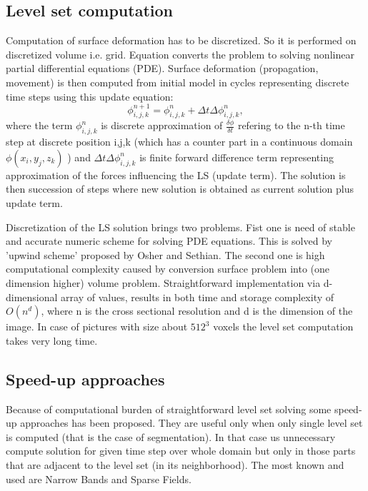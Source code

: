 \subsection{Level set computation}

Computation of surface deformation has to be discretized. So it is performed on discretized volume i.e. grid.
Equation converts the problem to solving nonlinear partial differential equations (PDE).
Surface deformation (propagation, movement) is then computed from initial model in cycles representing discrete time steps using this update equation:
\begin{equation}
\label{deformEqApprox}
\phi_{i,j,k}^{n+1} = \phi_{i,j,k}^{n} + \Delta t \Delta \phi_{i,j,k}^{n},
\end{equation}
where the term $\phi_{i,j,k}^{n}$ is discrete approximation of $\frac{\delta\phi}{\delta t}$ refering to the n-th time step at discrete position i,j,k (which has a counter part in a continuous domain $\phi(x_i, y_j, z_k)$ ) and $\Delta t \Delta \phi_{i,j,k}^{n}$ is finite forward difference term representing approximation of the forces influencing the LS (update term). The solution is then succession of steps where new solution is obtained as current solution plus update term.

Discretization of the LS solution brings two problems.
Fist one is need of stable and accurate numeric scheme for solving PDE equations.
This is solved by 'upwind scheme' proposed by Osher and Sethian\cite{sethianLS}.
The second one is high computational complexity caused by conversion surface problem into (one dimension higher) volume problem.
Straightforward implementation via d-dimensional array of values, results in both time and storage complexity of $O(n^d)$, where n is the cross sectional resolution and d is the dimension of the image.
In case of pictures with size about $512^3$ voxels the level set computation takes very long time.

\subsection{Speed-up approaches}

Because of computational burden of straightforward level set solving some speed-up approaches has been proposed.
They are useful only when only single level set is computed (that is the case of segmentation).
In that case us unnecessary compute solution for given time step over whole domain but only in those parts that are adjacent to the level set (in its neighborhood).
The most known and used are Narrow Bands and Sparse Fields.

